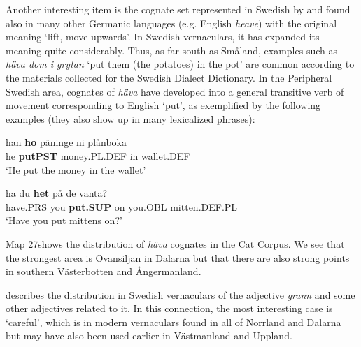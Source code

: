 
Another interesting item is the cognate set represented in Swedish by  and found also in many other Germanic languages (e.g. English \textit{heave}) with the original meaning ‘lift, move upwards’. In Swedish vernaculars, it has expanded its meaning quite considerably. Thus, as far south as Småland, examples such as \textit{häva dom i grytan} ‘put them (the potatoes) in the pot’ are common according to the materials collected for the Swedish Dialect Dictionary. In the Peripheral Swedish area, cognates\textit{ }of \textit{häva} have developed into a general transitive verb of movement corresponding to English ‘put’, as exemplified by the following examples (they also show up in many lexicalized phrases):


\ea\label{}
\gll han  \textbf{ho} päninge  ni  plånboka\\
he  \textbf{putPST} money.PL.DEF  in  wallet.DEF\\
\glt ‘He put the money in the wallet’
\z

\ea\label{}
\gll ha  du  \textbf{het} på  de  vanta?\\
have.PRS  you  \textbf{put.SUP} on  you.OBL  mitten.DEF.PL\\
\glt ‘Have you put mittens on?’
\z

Map 27shows the distribution of \textit{häva} cognates in the Cat Corpus. We see that the strongest area is Ovansiljan in Dalarna but that there are also strong points in southern Västerbotten and Ångermanland. 


\citet{Eaker1993} describes the distribution in Swedish vernaculars of the adjective \textit{grann} and some other adjectives related to it. In this connection, the most interesting case is  ‘careful’, which is in modern vernaculars found in all of Norrland and Dalarna but may have also been used earlier in Västmanland and Uppland. 


